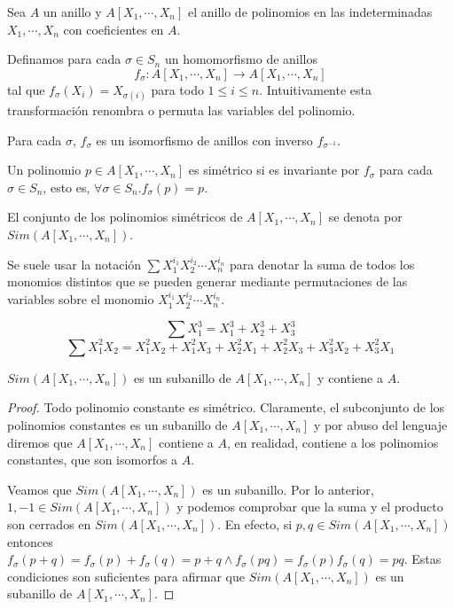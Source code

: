 Sea $A$ un anillo y $A[X_1,\cdots ,X_n]$ el anillo de polinomios en las indeterminadas $X_1,\cdots ,X_n$ con coeficientes en $A$. 

Definamos para cada $\sigma \in S_n$ un homomorfismo de anillos $$f_\sigma:A[X_1,\cdots,X_n] \to A[X_1,\cdots,X_n]$$ tal que $f_\sigma(X_i) = X_{\sigma(i)}$ para todo $1 \le i \le n$. Intuitivamente esta transformación renombra o permuta las variables del polinomio. 

\begin{proposition}
Para cada $\sigma$, $f_\sigma$ es un isomorfismo de anillos con inverso $f_{\sigma^{-1}}$. 
\end{proposition}

\begin{definition}
Un polinomio $p \in A[X_1,\cdots,X_n]$ es simétrico si es invariante por $f_\sigma$ para cada $\sigma \in S_n$, esto es, $\forall \sigma \in S_n. f_\sigma(p) = p$. 

El conjunto de los polinomios simétricos de $A[X_1,\cdots,X_n]$ se denota por $Sim(A[X_1,\cdots,X_n])$. 

Se suele usar la notación $\sum X_1^{i_1}X_2^{i_2} \cdots X_n^{i_n}$ para denotar la suma de todos los monomios distintos que se pueden generar mediante permutaciones de las variables sobre el monomio $X_1^{i_1}X_2^{i_2} \cdots X_n^{i_n}$. 
\end{definition}

\begin{example}
$$\sum X_1^3 = X_1^3 + X_2^3 + X_3^3$$
$$\sum X_1^2X_2 = X_1^2X_2 + X_1^2X_3 + X_2^2X_1 + X_2^2X_3 + X_3^2X_2 + X_3^2X_1$$
\end{example}

\begin{proposition}
$Sim(A[X_1,\cdots,X_n])$ es un subanillo de $A[X_1,\cdots ,X_n]$ y contiene a $A$. 
\end{proposition}
\begin{proof}
Todo polinomio constante es simétrico. Claramente, el subconjunto de los polinomios constantes es un subanillo de $A[X_1,\cdots ,X_n]$ y por abuso del lenguaje diremos que $A[X_1,\cdots ,X_n]$ contiene a $A$, en realidad, contiene a los polinomios constantes, que son isomorfos a $A$. 

Veamos que $Sim(A[X_1,\cdots,X_n])$ es un subanillo. Por lo anterior, $1,-1 \in Sim(A[X_1,\cdots,X_n])$ y podemos comprobar que la suma y el producto son cerrados en $Sim(A[X_1,\cdots,X_n])$. En efecto, si $p,q \in Sim(A[X_1,\cdots,X_n])$ entonces  $f_\sigma(p+q) = f_\sigma(p) + f_\sigma(q) = p + q \land f_\sigma(pq) = f_\sigma(p)f_\sigma(q) = pq$. Estas condiciones son suficientes para afirmar que $Sim(A[X_1,\cdots,X_n])$ es un subanillo de $A[X_1,\cdots ,X_n]$.
\end{proof}


